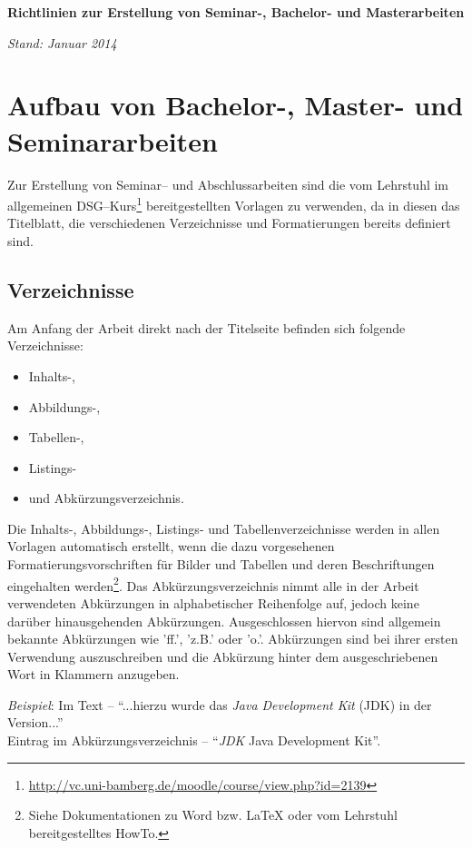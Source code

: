
%

\atitle
%
\begin{center}
{\bf\huge Richtlinien zur Erstellung von Seminar-, Bachelor- und Masterarbeiten}

{\it Stand: Januar 2014}
\end{center}
%
\section{Aufbau von Bachelor-, Master- und Seminararbeiten}
%
Zur Erstellung von Seminar-- und Abschlussarbeiten sind die vom Lehrstuhl im allgemeinen DSG--Kurs\footnote{\url{http://vc.uni-bamberg.de/moodle/course/view.php?id=2139}} bereitgestellten Vorlagen zu verwenden, da in diesen das Titelblatt, die verschiedenen Verzeichnisse und Formatierungen bereits definiert sind.

\subsection{Verzeichnisse}

Am Anfang der Arbeit direkt nach der Titelseite befinden sich folgende Verzeichnisse:

\begin{itemize}
	\item Inhalts-,
	\item Abbildungs-,
	\item Tabellen-,
	\item Listings-
	\item und Abkürzungsverzeichnis.
\end{itemize}
	
Die Inhalts-, Abbildungs-, Listings- und Tabellenverzeichnisse werden in allen Vorlagen automatisch
erstellt, wenn die dazu vorgesehenen Formatierungsvorschriften für Bilder und Tabellen
und deren Beschriftungen eingehalten werden\footnote{Siehe Dokumentationen zu Word bzw. LaTeX oder vom Lehrstuhl bereitgestelltes HowTo.}. 
Das Abkürzungsverzeichnis nimmt alle
in der Arbeit verwendeten Abkürzungen in alphabetischer Reihenfolge auf, jedoch keine
darüber hinausgehenden Abkürzungen. Ausgeschlossen hiervon sind allgemein bekannte
Abkürzungen wie 'ff.', 'z.B.' oder 'o.'. Abkürzungen sind bei ihrer ersten Verwendung
auszuschreiben und die Abkürzung hinter dem ausgeschriebenen Wort in Klammern anzugeben.

\textit{Beispiel}: Im Text -- "`...hierzu wurde das \textit{Java Development Kit} (JDK) in der Version..."'\\
Eintrag im Abkürzungsverzeichnis -- "`\textit{JDK} \hspace{10pt} Java Development Kit"'.


